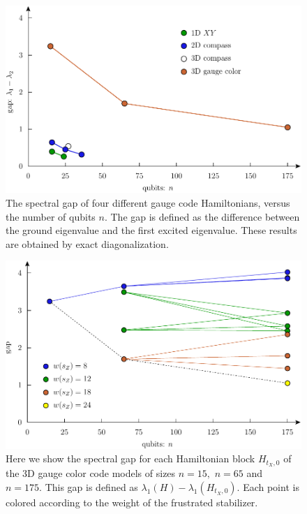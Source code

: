 \documentclass[12pt]{article}
\begin{document}
\begin{figure}
\begin{center}
\includegraphics[width=1.0\columnwidth]{pic-gap.pdf}
\caption{The spectral gap of four different gauge code Hamiltonians, versus the number
of qubits $n$. The gap is defined as the difference between
the ground eigenvalue and the first excited eigenvalue.
These results are obtained by exact diagonalization.
}
\label{PicGap}
\end{center}
\end{figure}

\begin{figure}
\begin{center}
\includegraphics[width=1.0\columnwidth]{pic-gap-stabs.pdf}
\caption{
Here we show the spectral gap
for each Hamiltonian block $H_{t_X,0}$
of the 3D gauge color code models of sizes $n=15,$ $n=65$ and $n=175.$
This gap is defined as $\lambda_1(H) - \lambda_1(H_{t_X,0}).$
Each point is colored according to the weight of the
frustrated stabilizer.
}
\label{PicGapStabs}
\end{center}
\end{figure}
\end{document}
